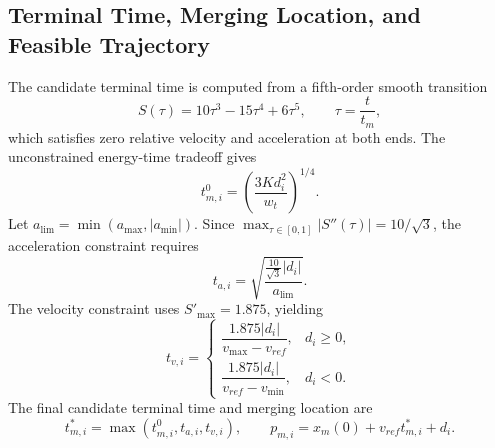 \documentclass[conference]{IEEEtran}
\begin{document}
\subsection{Terminal Time, Merging Location, and Feasible Trajectory}
The candidate terminal time is computed from a fifth-order smooth transition
\begin{equation}
    S(\tau)=10\tau^3-15\tau^4+6\tau^5,\qquad
    \tau=\frac{t}{t_m},
    \label{eq:smooth_function}
\end{equation}
which satisfies zero relative velocity and acceleration at both ends. The
unconstrained energy-time tradeoff gives
\begin{equation}
    t_{m,i}^{0}
    =
    \left(\frac{3K d_i^2}{w_t}\right)^{1/4}.
    \label{eq:t_unconstrained}
\end{equation}
Let \(a_{\lim}=\min(a_{\max},|a_{\min}|)\). Since
\(\max_{\tau\in[0,1]}|S''(\tau)|=10/\sqrt{3}\), the acceleration constraint
requires
\begin{equation}
    t_{a,i}
    =
    \sqrt{
    \frac{\frac{10}{\sqrt{3}}|d_i|}{a_{\lim}}
    }.
    \label{eq:t_acc}
\end{equation}
The velocity constraint uses \(S'_{\max}=1.875\), yielding
\begin{equation}
    t_{v,i}
    =
    \begin{cases}
    \dfrac{1.875|d_i|}{v_{\max}-v_{ref}}, & d_i\geq 0,\\[8pt]
    \dfrac{1.875|d_i|}{v_{ref}-v_{\min}}, & d_i<0.
    \end{cases}
    \label{eq:t_vel}
\end{equation}
The final candidate terminal time and merging location are
\begin{equation}
    t_{m,i}^*
    =
    \max(t_{m,i}^{0},t_{a,i},t_{v,i}),
    \qquad
    p_{m,i}=x_m(0)+v_{ref}t_{m,i}^*+d_i.
    \label{eq:terminal_time_location}
\end{equation}
\end{document}
